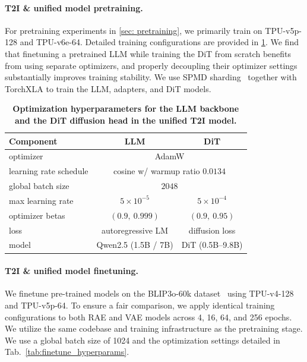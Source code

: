 \documentclass[10pt,twocolumn,letterpaper]{article}
\begin{document}
\paragraph{T2I \& unified model pretraining.}

For pretraining experiments in \cref{sec: pretraining}, we primarily train on TPU-v5p-128 and TPU-v6e-64. Detailed training configurations are provided in \cref{tab: pretrain configs}. We find that finetuning a pretrained LLM while training the DiT from scratch benefits from using separate optimizers, and properly decoupling their optimizer settings substantially improves training stability. We use SPMD sharding~\citep{barham2022pathways} together with TorchXLA to train the LLM, adapters, and DiT models.


\begin{table}[h]
\centering
\small
\setlength{\tabcolsep}{3.4pt}  %
\begin{tabular}{lcc}
\toprule
\textbf{Component}        & \textbf{LLM}                    & \textbf{DiT} \\ %
\midrule
optimizer                 & \multicolumn{2}{c}{AdamW} \\
learning rate schedule    & \multicolumn{2}{c}{cosine w/ warmup ratio $0.0134$} \\
global batch size         & \multicolumn{2}{c}{$2048$} \\
\midrule
max learning rate         & $5 \times 10^{-5}$              & $5 \times 10^{-4}$ \\
optimizer betas           & $(0.9,\ 0.999)$                 & $(0.9,\ 0.95)$ \\
loss                      & autoregressive LM               & diffusion loss \\
model                     & Qwen2.5 (1.5B / 7B)             & DiT (0.5B–9.8B) \\
\bottomrule
\end{tabular}
\caption{\textbf{Optimization hyperparameters for the LLM backbone and the DiT diffusion head in the unified T2I model.}}
\label{tab: pretrain configs}
\end{table}





\paragraph{T2I \& unified model finetuning.}
We finetune pre-trained models on the BLIP3o-60k dataset~\cite{chen2025blip3} using TPU-v4-128 and TPU-v5p-64. To ensure a fair comparison, we apply identical training configurations to both RAE and VAE models across 4, 16, 64, and 256 epochs. We utilize the same codebase and training infrastructure as the pretraining stage. We use a global batch size of 1024 and the optimization settings detailed in Tab.~\ref{tab:finetune_hyperparams}.
\end{document}

